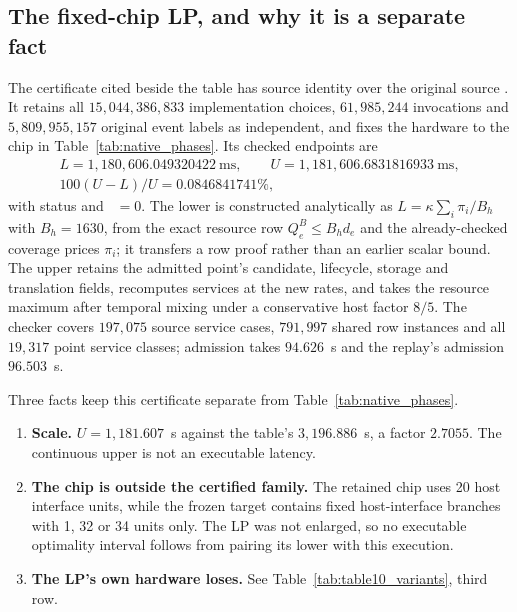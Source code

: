 \subsection{The fixed-chip LP, and why it is a separate fact}
The certificate cited beside the table has source identity
 over the
original source
. It
retains all $15{,}044{,}386{,}833$ implementation choices, $61{,}985{,}244$
invocations and $5{,}809{,}955{,}157$ original event labels as independent, and
fixes the hardware to the chip in Table~\ref{tab:native_phases}. Its checked
endpoints are
\[
 \begin{gathered}
 L=1{,}180{,}606.049320422\ \mathrm{ms},\qquad
 U=1{,}181{,}606.6831816933\ \mathrm{ms},\\
 100(U-L)/U=0.0846841741\%,
 \end{gathered}
\]
with status  and
~$=0$. The lower is constructed analytically as
$L=\kappa\sum_i\pi_i/B_h$ with $B_h=1630$, from the exact resource row
$Q^B_e\le B_h d_e$ and the already-checked coverage prices $\pi_i$; it transfers
a row proof rather than an earlier scalar bound. The upper retains the admitted
point's candidate, lifecycle, storage and translation fields, recomputes
services at the new rates, and takes the resource maximum after temporal mixing
under a conservative host factor $8/5$. The checker covers $197{,}075$ source
service cases, $791{,}997$ shared row instances and all $19{,}317$ point service
classes; admission takes $94.626$~s and the replay's admission $96.503$~s.

Three facts keep this certificate separate from Table~\ref{tab:native_phases}.

\begin{enumerate}
\item \textbf{Scale.} $U=1{,}181.607$~s against the table's $3{,}196.886$~s, a
factor $2.7055$. The continuous upper is not an executable latency.
\item \textbf{The chip is outside the certified family.} The retained chip uses
20 host interface units, while the frozen target
 contains
fixed host-interface branches with 1, 32 or 34 units only. The LP was not
enlarged, so no executable optimality interval follows from pairing its lower
with this execution.
\item \textbf{The LP's own hardware loses.} See
Table~\ref{tab:table10_variants}, third row.
\end{enumerate}

